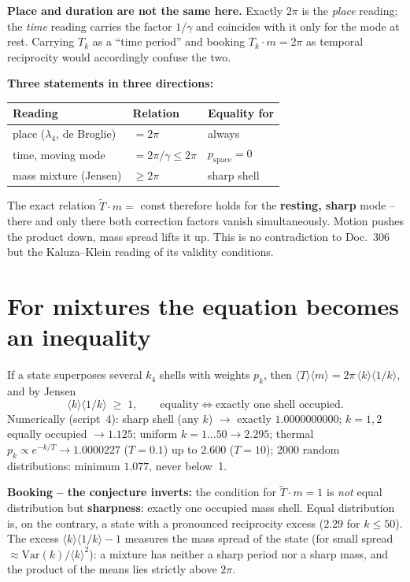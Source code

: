\documentclass[11pt]{report}
\begin{document}
\textbf{Place and duration are not the same here.} Exactly $2\pi$
is the \emph{place} reading; the \emph{time} reading carries the
factor $1/\gamma$ and coincides with it only for the mode at rest.
Carrying $T_k$ as a \enquote{time period} and booking
$T_k\cdot m = 2\pi$ as temporal reciprocity would accordingly
confuse the two.

\textbf{Three statements in three directions:}
\begin{center}
\begin{tabular}{lll}
\toprule
Reading & Relation & Equality for \\
\midrule
place ($\lambda_4$, de Broglie) & $=2\pi$ & always \\
time, moving mode & $=2\pi/\gamma \le 2\pi$ &
  $p_\text{space} = 0$ \\
mass mixture (Jensen) & $\ge 2\pi$ & sharp shell \\
\bottomrule
\end{tabular}
\end{center}

\noindent The exact relation $\tilde T\cdot m = $ const therefore
holds for the \textbf{resting, sharp} mode -- there and only there
both correction factors vanish simultaneously. Motion pushes the
product down, mass spread lifts it up. This is no contradiction to
Doc.~306 but the Kaluza--Klein reading of its validity
conditions.

\section{For mixtures the equation becomes an inequality}

If a state superposes several $k_4$ shells with weights $p_k$,
then $\langle T\rangle\langle m\rangle =
2\pi\,\langle k\rangle\langle 1/k\rangle$, and by Jensen
\begin{equation}
  \langle k\rangle\langle 1/k\rangle \;\ge\; 1,
  \qquad\text{equality} \iff \text{exactly one shell occupied.}
\end{equation}
Numerically (script~4): sharp shell (any $k$) $\to$ exactly
$1.0000000000$; $k = 1,2$ equally occupied $\to 1.125$; uniform
$k = 1\ldots50 \to 2.295$; thermal
$p_k \propto e^{-k/T} \to 1.0000227$ ($T = 0.1$) up to
$2.600$ ($T = 10$); 2000 random distributions: minimum $1.077$,
never below~1.

\textbf{Booking -- the conjecture inverts:} the condition for
$\tilde T\cdot m = 1$ is \emph{not} equal distribution but
\textbf{sharpness}: exactly one occupied mass shell. Equal
distribution is, on the contrary, a state with a pronounced
reciprocity excess ($2.29$ for $k \le 50$). The excess
$\langle k\rangle\langle 1/k\rangle - 1$ measures the mass
spread of the state (for small spread
$\approx \mathrm{Var}(k)/\langle k\rangle^2$): a mixture has
neither a sharp period nor a sharp mass, and the product of the
means lies strictly above $2\pi$.
\end{document}
